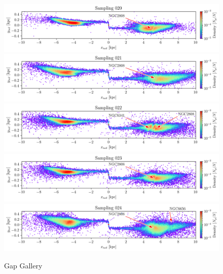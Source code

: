 \documentclass[draft]{aa}
\begin{document}
\begin{appendix}
    \begin{figure}
      \centering
      \includegraphics[width=\linewidth]{gallery_of_gaps_monte-carlo-020.png}
      \includegraphics[width=\linewidth]{gallery_of_gaps_monte-carlo-021.png}
      \includegraphics[width=\linewidth]{gallery_of_gaps_monte-carlo-022.png}
      \includegraphics[width=\linewidth]{gallery_of_gaps_monte-carlo-023.png}
      \includegraphics[width=\linewidth]{gallery_of_gaps_monte-carlo-024.png}
      \caption{Gap Gallery}
      \label{fig:TailCoordinates}
    \end{figure}        


\end{appendix}
\end{document}
